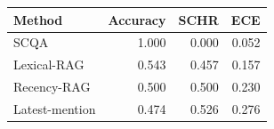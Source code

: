 \begin{table}[!ht]\centering\begin{tabular}{lrrr}\toprule Method & Accuracy & SCHR & ECE\\\midrule
SCQA & 1.000 & 0.000 & 0.052\\
Lexical-RAG & 0.543 & 0.457 & 0.157\\
Recency-RAG & 0.500 & 0.500 & 0.230\\
Latest-mention & 0.474 & 0.526 & 0.276\\
\bottomrule\end{tabular}\end{table}
